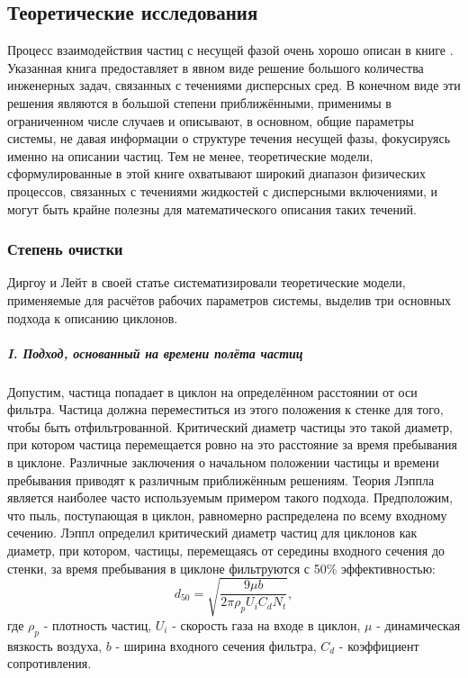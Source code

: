 	\subsection{Теоретические исследования}
	\label{theoreticalOverview}
		\hspace{1em}
		Процесс взаимодействия частиц с несущей фазой очень хорошо описан в книге \cite{Richardson}. Указанная книга предоставляет в явном виде решение большого количества инженерных задач, связанных с течениями дисперсных сред. В конечном виде эти решения являются в большой степени приближёнными, применимы в ограниченном числе случаев и описывают, в основном, общие параметры системы, не давая информации о структуре течения несущей фазы, фокусируясь именно на описании частиц. Тем не менее, теоретические модели, сформулированные в этой книге охватывают широкий диапазон физических процессов, связанных с течениями жидкостей с дисперсными включениями, и могут быть крайне полезны для математического описания таких течений.
		\subsubsection*{Степень очистки}
		Диргоу и Лейт \cite{DirgoLeith} в своей статье систематизировали теоретические модели, применяемые для расчётов рабочих параметров системы, выделив три основных подхода к описанию циклонов.
			\subparagraph{I. Подход, основанный на времени полёта частиц\\}
			Допустим, частица попадает в циклон на определённом расстоянии от оси фильтра. Частица должна переместиться из этого положения к стенке для того, чтобы быть отфильтрованной. Критический диаметр частицы это такой диаметр, при котором частица перемещается ровно на это расстояние за время пребывания в циклоне. Различные заключения о начальном положении частицы и времени пребывания приводят к различным приближённым решениям. Теория Лэппла \cite{Lapple} является наиболее часто используемым примером такого подхода. Предположим, что пыль, поступающая в циклон, равномерно распределена по всему входному сечению. Лэппл определил критический диаметр частиц для циклонов как диаметр, при котором, частицы, перемещаясь от середины входного сечения до стенки, за время пребывания в циклоне фильтруются с 50\% эффективностью:
			\begin{equation}
				\label{LappleEquation}
				d_{50} = \sqrt{\frac{9\mu b}{2 \pi \rho_p U_i C_d N_t}},
			\end{equation}
			где $\rho_p$ - плотность частиц, $U_i$ - скорость газа на входе в циклон, $\mu$ - динамическая вязкость воздуха, $b$ - ширина входного сечения фильтра, $C_d$ - коэффициент сопротивления.
			
